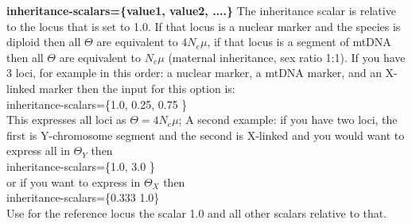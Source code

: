 \begin{description}
%
%
%

\item {\bf inheritance-scalars=\{value1, value2, ....\}} 
The inheritance scalar is relative to the locus that is set to 1.0. If that locus is a nuclear marker and the species is diploid then all $\Theta$ are equivalent to $4N_e\mu$, if that locus is a segment of mtDNA then all $\Theta$ are equivalent to $N_e\mu$ (maternal inheritance, sex ratio 1:1). If you have 3 loci, for example in this order: a nuclear marker, a mtDNA marker, and an X-linked marker then the input for this option is:\\
inheritance-scalars=\{1.0, 0.25, 0.75 \}\\
This expresses all loci as $\Theta=4N_e\mu$; A second example: if you have two loci, the first is Y-chromosome segment and the second is X-linked and you would want to express all in $\Theta_Y$ then \\
inheritance-scalars=\{1.0, 3.0 \}\\
or if you want to express in $\Theta_X$ then\\
inheritance-scalars=\{0.333 1.0\}\\
Use for the reference locus the scalar 1.0 and all other scalars relative to that.


\end{description}
